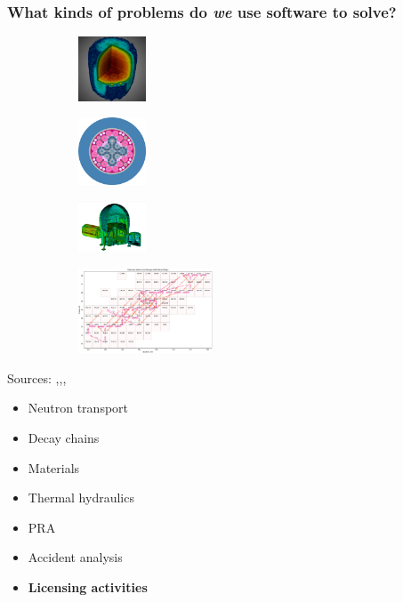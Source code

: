 \begin{frame}
    \frametitle{What kinds of problems do {\it we} use software to solve?}

    \begin{figure}[htpb]
        \begin{subfigure}
            \centering
            \includegraphics[width=2cm]{images/exasmr.png}
        \end{subfigure}
        \begin{subfigure}
           \centering
           \includegraphics[width=2cm]{images/atr.png} 
        \end{subfigure}
        \begin{subfigure}
           \centering
           \includegraphics[width=2cm]{images/hab1.png} 
        \end{subfigure}
        \begin{subfigure}
            \centering
            \includegraphics[width=4cm]{images/transmutation.png}
        \end{subfigure}
    \end{figure}
    \begin{center}
      {\tiny Sources: \cite{exasmr_fig},\cite{openmc_atr_slice},\cite{dagmc_nasa_module},\cite{armi_transmutation_fig}}
    \end{center}
    \pause\medskip
    \begin{itemize}
        \item Neutron transport
        \item Decay chains
        \item Materials
        \item Thermal hydraulics
        \item PRA
        \item Accident analysis
        \item {\bf Licensing activities}
    \end{itemize}

\end{frame}

